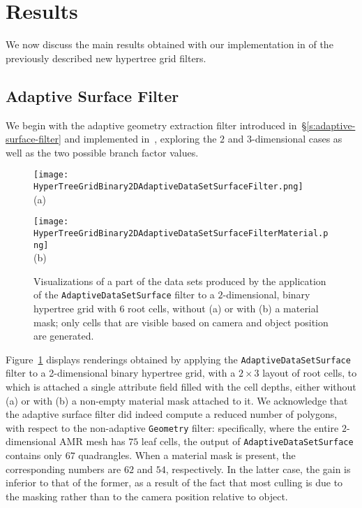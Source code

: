 \section{Results}
\label{s:results}
We now discuss the main results obtained with our implementation in
\VTK{} of the previously described new hypertree grid filters.
\subsection{Adaptive Surface Filter}
\label{s:adaptive-surface-filter-results}
We begin with the adaptive geometry extraction filter introduced
in~\S\ref{s:adaptive-surface-filter} and implemented 
in~\VTK{}, exploring the $2$ and $3$-dimensional cases as well as
the two possible branch factor values.
\begin{figure}[h!]
\centering
\begin{minipage}[t]{0.48\columnwidth}
\centering
\vspace{0pt}
\texttt{[image: HyperTreeGridBinary2DAdaptiveDataSetSurfaceFilter.png]}\\
(a)
\end{minipage}
\hfil
\begin{minipage}[t]{0.48\columnwidth}
\centering
\vspace{0pt}
\texttt{[image: HyperTreeGridBinary2DAdaptiveDataSetSurfaceFilterMaterial.png]}\\
(b)
\end{minipage}
\caption{Visualizations of a part of the data sets produced by the
application of the \texttt{AdaptiveDataSetSurface} filter to a
$2$-dimensional, binary hypertree grid with 6 root cells, without (a)
or with (b) a material mask; only cells that are visible based on
camera and object position are generated.}
\label{fig:HyperTreeGridBinary2DAdaptiveDataSetSurfaceFilter}
\end{figure}

Figure~\ref{fig:HyperTreeGridBinary2DAdaptiveDataSetSurfaceFilter}
displays renderings obtained by applying the
\texttt{AdaptiveDataSetSurface} filter to a 2-dimensional binary hypertree grid,
with a $2\times3$ layout of root cells, to which is attached a single
attribute field filled with the cell depths, either without (a) or
with (b) a non-empty material mask attached to it.
We acknowledge that the adaptive surface filter did indeed
compute a reduced number of polygons, with respect to the non-adaptive
\texttt{Geometry} filter: specifically, where the entire
$2$-dimensional AMR mesh has $75$ leaf cells, the output of
\texttt{AdaptiveDataSetSurface} contains only $67$ quadrangles.
When a material mask is present, the corresponding
numbers are $62$ and $54$, respectively.
In the latter case, the gain is inferior to that of the former, as a
result of the fact that most culling is due to the masking rather than
to the camera position relative to object.

